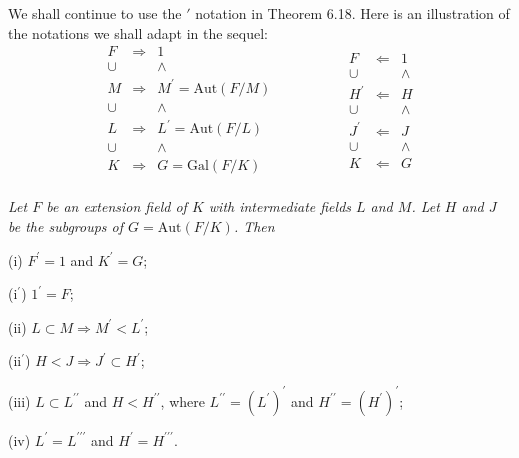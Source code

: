 We shall continue to use the $\prime$ notation in Theorem 6.18. Here is an illustration of the notations we shall adapt in the sequel: 
$$
\begin{matrix}
	F&		\Longrightarrow&		1\\
	\cup&		&		\land\\
	M&		\Longrightarrow&		M^{\prime}=\mathrm{Aut}\left( F/M \right)\\
	\cup&		&		\land\\
	L&		\Longrightarrow&		L^{\prime}=\mathrm{Aut}\left( F/L \right)\\
	\cup&		&		\land\\
	K&		\Longrightarrow&		G=\mathrm{Gal}\left( F/K \right)\\
\end{matrix}\hspace{2cm}\begin{matrix}
	F&		\Longleftarrow&		1\\
	\cup&		&		\land\\
	H^{\prime}&		\Longleftarrow&		H\\
	\cup&		&		\land\\
	J^{\prime}&		\Longleftarrow&		J\\
	\cup&		&		\land\\
	K&		\Longleftarrow&		G\\
\end{matrix}
$$
\begin{lemma}\em
Let $F$ be an extension field of $K$ with intermediate fields $L$ and $M$. Let $H$ and $J$ be the subgroups of $G=\mathrm{Aut}(F/K)$. Then\par
(i) $F^\prime=1$ and $K^\prime=G$;\par
(i$^\prime$) $1^\prime=F$;\par
(ii) $L\subset M\Rightarrow M^\prime< L^\prime$;\par
(ii$^\prime$) $H<J\Rightarrow J^\prime\subset H^\prime$;\par
(iii) $L\subset L^{\prime\prime}$ and $H<H^{\prime\prime}$, where $L^{\prime\prime}=(L^\prime)^\prime$ and $H^{\prime\prime}=(H^\prime)^\prime$;\par
(iv) $L^\prime=L^{\prime\prime\prime}$ and $H^\prime=H^{\prime\prime\prime}$.
\end{lemma}
